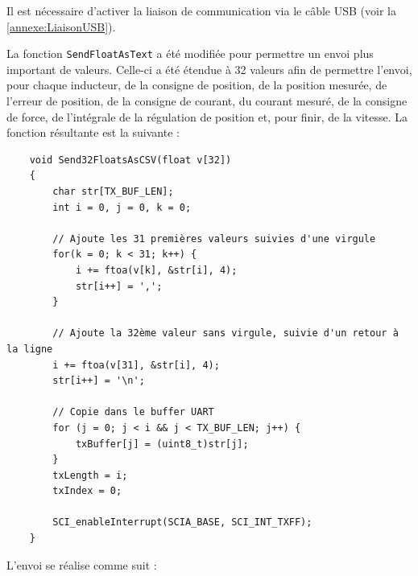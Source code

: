 Il est nécessaire d'activer la liaison de communication via le câble USB (voir la \autoref{annexe:LiaisonUSB}).

La fonction \texttt{SendFloatAsText} a été modifiée pour permettre un envoi plus important de valeurs. Celle-ci a été étendue à 32 valeurs afin de permettre l'envoi, pour chaque inducteur, de la consigne de position, de la position mesurée, de l'erreur de position, de la consigne de courant, du courant mesuré, de la consigne de force, de l'intégrale de la régulation de position et, pour finir, de la vitesse. La fonction résultante est la suivante :

\begin{verbatim}
    void Send32FloatsAsCSV(float v[32])
    {
        char str[TX_BUF_LEN];
        int i = 0, j = 0, k = 0;

        // Ajoute les 31 premières valeurs suivies d'une virgule
        for(k = 0; k < 31; k++) {
            i += ftoa(v[k], &str[i], 4);
            str[i++] = ',';
        }

        // Ajoute la 32ème valeur sans virgule, suivie d'un retour à la ligne
        i += ftoa(v[31], &str[i], 4);
        str[i++] = '\n';

        // Copie dans le buffer UART
        for (j = 0; j < i && j < TX_BUF_LEN; j++) {
            txBuffer[j] = (uint8_t)str[j];
        }
        txLength = i;
        txIndex = 0;

        SCI_enableInterrupt(SCIA_BASE, SCI_INT_TXFF);
    }
\end{verbatim}

L'envoi se réalise comme suit :

